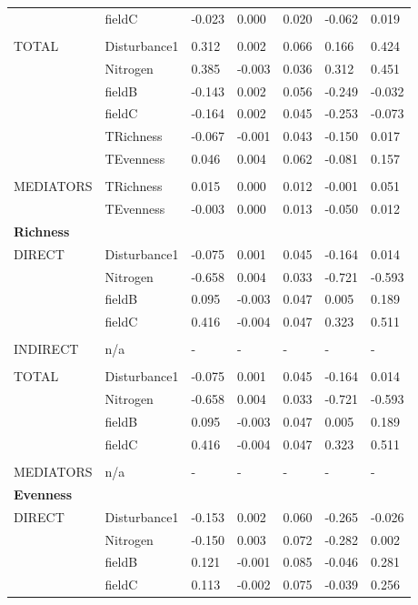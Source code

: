 \begin{longtable}[c]{l l l l l l l }
 & fieldC & -0.023 & 0.000 & 0.020 & -0.062 & 0.019\\
 & & & & & & \\
 TOTAL & Disturbance1 & 0.312 & 0.002 & 0.066 & 0.166 & 0.424\\
 & Nitrogen & 0.385 & -0.003 & 0.036 & 0.312 & 0.451\\
 & fieldB & -0.143 & 0.002 & 0.056 & -0.249 & -0.032\\
 & fieldC & -0.164 & 0.002 & 0.045 & -0.253 & -0.073\\
 & TRichness & -0.067 & -0.001 & 0.043 & -0.150 & 0.017\\
 & TEvenness & 0.046 & 0.004 & 0.062 & -0.081 & 0.157\\
 & & & & & & \\
 MEDIATORS &TRichness & 0.015 & 0.000 & 0.012 & -0.001 & 0.051\\
 & TEvenness & -0.003 & 0.000 & 0.013 & -0.050 & 0.012\\
\textbf{Richness} &  &  &  &  &  &\\
\hline
 DIRECT & Disturbance1 & -0.075 & 0.001 & 0.045 & -0.164 & 0.014\\
 & Nitrogen & -0.658 & 0.004 & 0.033 & -0.721 & -0.593\\
 & fieldB & 0.095 & -0.003 & 0.047 & 0.005 & 0.189\\
 & fieldC & 0.416 & -0.004 & 0.047 & 0.323 & 0.511\\
 & & & & & & \\
 INDIRECT & n/a & - & - & - & - & -\\
 & & & & & & \\
 TOTAL & Disturbance1 & -0.075 & 0.001 & 0.045 & -0.164 & 0.014\\
 & Nitrogen & -0.658 & 0.004 & 0.033 & -0.721 & -0.593\\
 & fieldB & 0.095 & -0.003 & 0.047 & 0.005 & 0.189\\
 & fieldC & 0.416 & -0.004 & 0.047 & 0.323 & 0.511\\
 & & & & & & \\
 MEDIATORS &n/a & - & - & - & - & -\\
\textbf{Evenness} &  &  &  &  &  &\\
\hline
 DIRECT & Disturbance1 & -0.153 & 0.002 & 0.060 & -0.265 & -0.026\\
 & Nitrogen & -0.150 & 0.003 & 0.072 & -0.282 & 0.002\\
 & fieldB & 0.121 & -0.001 & 0.085 & -0.046 & 0.281\\
 & fieldC & 0.113 & -0.002 & 0.075 & -0.039 & 0.256\\

\end{longtable}

